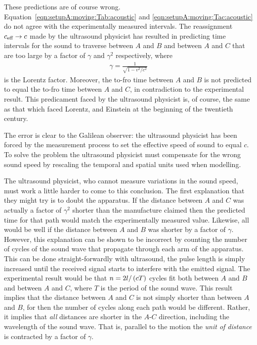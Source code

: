 These predictions are of course wrong.
Equation~\ref{eqn:setupA:moving:Tab:acoustic} and \ref{eqn:setupA:moving:Tac:acoustic} do not agree with the
experimentally measured intervals.
The reassignment $c_{\textrm{eff}} \rightarrow c$ made by the ultrasound physicist 
has resulted in predicting time intervals for the sound to traverse between $A$ and $B$ and between $A$ and $C$ that are too large
by a factor of $\gamma$ and $\gamma^2$ respectively,
where 
\begin{align}
  \gamma = \frac{1}{\sqrt{1-v^2/c^2}}
  \label{eqn:gamma}
\end{align}
is the Lorentz factor.
Moreover, the to-fro time between $A$ and $B$ is not predicted to equal  the to-fro time between $A$ and $C$,
in contradiction to the  experimental result.
This predicament faced by the ultrasound physicist  is, of course, the same as that which faced Lorentz, \Poincare and Einstein at the beginning  of the twentieth century.



The error is clear to the Galilean observer:
the ultrasound physicist has been forced by the measurement process to  set the effective speed of sound to equal $c$.
To solve the problem the ultrasound physicist  must  compensate for the wrong sound speed by rescaling the temporal and spatial units  used when modelling.

The ultrasound physicist, who cannot measure variations in the sound speed,
must work a little harder to come to this conclusion.
The first explanation that they might try  is to doubt the apparatus.
If the distance between $A$ and $C$  was actually a factor of  $\gamma^2$ shorter than the manufacture claimed then the predicted time for that path would match the 
experimentally measured value.
Likewise, all would be well if the distance between $A$ and $B$  was shorter by a factor of $\gamma$.
However, this explanation can be shown to be incorrect by  counting  the number of cycles of the sound wave that propagate through each arm of the apparatus.
This can be done straight-forwardly with ultrasound,
the  pulse length is simply increased until the received signal starts to interfere with the emitted signal.
The experimental result would be that  $n = 2l/\left( cT \right)$ cycles fit both  between  $A$ and $B$ and between $A$ and $C$, where $T$ is the period of the sound wave.
This result implies that the distance between $A$ and $C$ is not simply shorter than between $A$ and $B$, %
for then the number of cycles along each path would be different.
Rather, it implies that {\em all} distances are shorter in the $A$-$C$ direction, including the wavelength of the sound wave.
That is, parallel to the motion the {\em   unit of distance} is contracted  by a factor of $\gamma$.


